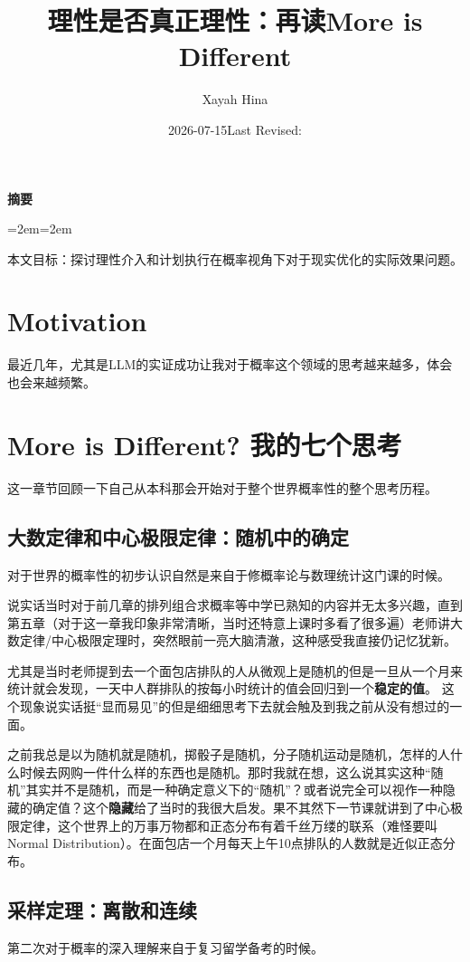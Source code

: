\documentclass[11pt,twoside,fontset=none,scheme=plain]{ctexart}
\title{理性是否真正理性：再读More is Different}
\author{Xayah Hina}
\date{2026-07-15\quad\textperiodcentered\quad Last Revised: \writinglastrevised}
\makeatletter
\renewcommand{\abstractname}{摘要}
\renewenvironment{abstract}{%
    \begin{center}
    \small\sffamily\bfseries\color{bookink}\abstractname
    \end{center}
    \begin{list}{}{\leftmargin=2em\rightmargin=2em}
    \item\relax\small\color{mutedink}\noindent\ignorespaces
}{%
    \end{list}
    \vspace{1.2em}
}
\renewcommand{\maketitle}{%
    \thispagestyle{plain}%
    \begin{center}
        \vspace*{0.6em}
        {\LARGE\sffamily\bfseries\color{bookink}\@title\par}
        \vspace{1em}
        {\small\color{mutedink}\@author\quad\textperiodcentered\quad\@date\par}
    \end{center}
    \vspace{1.8em}
}
\makeatother
\begin{document}
    \maketitle

    \begin{abstract}
        本文目标：探讨理性介入和计划执行在概率视角下对于现实优化的实际效果问题。
    \end{abstract}


    \section{Motivation}
    最近几年，尤其是LLM的实证成功让我对于概率这个领域的思考越来越多，体会也会来越频繁。


    \section{More is Different? 我的七个思考}
    这一章节回顾一下自己从本科那会开始对于整个世界概率性的整个思考历程。

    \subsection{大数定律和中心极限定律：随机中的确定}
    对于世界的概率性的初步认识自然是来自于修概率论与数理统计这门课的时候。

    说实话当时对于前几章的排列组合求概率等中学已熟知的内容并无太多兴趣，直到第五章（对于这一章我印象非常清晰，当时还特意上课时多看了很多遍）老师讲大数定律/中心极限定理时，突然眼前一亮大脑清澈，这种感受我直接仍记忆犹新。

    尤其是当时老师提到去一个面包店排队的人从微观上是随机的但是一旦从一个月来统计就会发现，一天中人群排队的按每小时统计的值会回归到一个\textbf{稳定的值}。 这个现象说实话挺“显而易见”的但是细细思考下去就会触及到我之前从没有想过的一面。

    之前我总是以为随机就是随机，掷骰子是随机，分子随机运动是随机，怎样的人什么时候去网购一件什么样的东西也是随机。那时我就在想，这么说其实这种“随机”其实并不是随机，而是一种确定意义下的“随机”？或者说完全可以视作一种隐藏的确定值？这个\textbf{隐藏}给了当时的我很大启发。果不其然下一节课就讲到了中心极限定律，这个世界上的万事万物都和正态分布有着千丝万缕的联系（难怪要叫Normal Distribution）。在面包店一个月每天上午10点排队的人数就是近似正态分布。

    \subsection{采样定理：离散和连续}
    第二次对于概率的深入理解来自于复习留学备考的时候。
\end{document}

